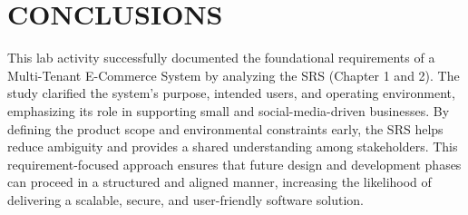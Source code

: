 \chapter{CONCLUSIONS}\label{ch:conclusion}

This lab activity successfully documented the foundational requirements of a Multi-Tenant E-Commerce System by analyzing the SRS (Chapter 1 and 2). The study clarified the system’s purpose, intended users, and operating environment, emphasizing its role in supporting small and social-media-driven businesses. By defining the product scope and environmental constraints early, the SRS helps reduce ambiguity and provides a shared understanding among stakeholders. This requirement-focused approach ensures that future design and development phases can proceed in a structured and aligned manner, increasing the likelihood of delivering a scalable, secure, and user-friendly software solution.